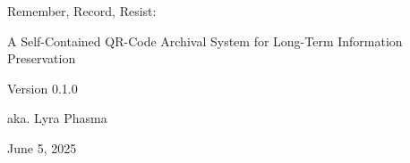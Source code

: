 

\begin{titlepage}
  \centering
  \vspace*{\fill}

  {\fontsize{2.625em}{3em}\selectfont\ManropeExtraBold Remember, Record, Resist: \par}
  {\HUGE A Self-Contained QR-Code Archival System for Long-Term Information Preservation \par}
  {\Large Version 0.1.0 \par}
  {\Large aka. Lyra Phasma \par}
  {\Large June 5, 2025 \par}

  \vspace*{\fill}
\end{titlepage}


\appendix



